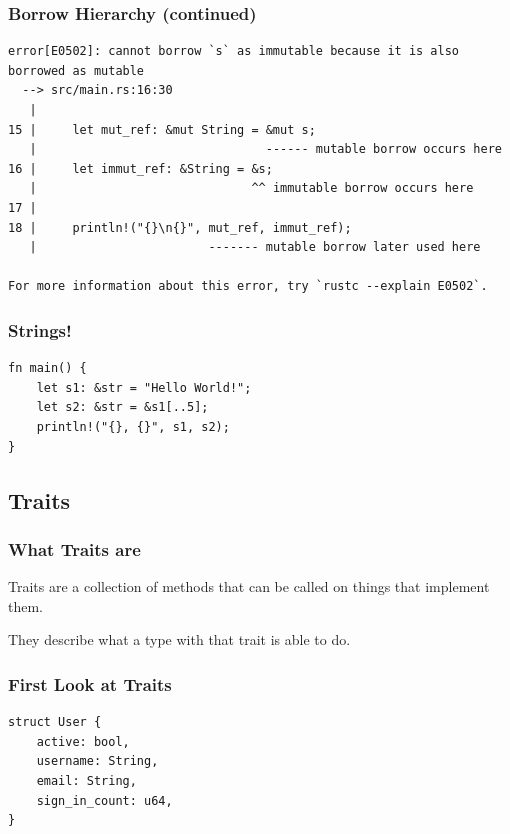 \documentclass{slides}
\begin{document}
\begin{frame}[fragile]
\frametitle{Borrow Hierarchy (continued)}
\begin{verbatim}
error[E0502]: cannot borrow `s` as immutable because it is also borrowed as mutable
  --> src/main.rs:16:30
   |
15 |     let mut_ref: &mut String = &mut s;
   |                                ------ mutable borrow occurs here
16 |     let immut_ref: &String = &s;
   |                              ^^ immutable borrow occurs here
17 |     
18 |     println!("{}\n{}", mut_ref, immut_ref);
   |                        ------- mutable borrow later used here

For more information about this error, try `rustc --explain E0502`.
\end{verbatim}
\end{frame}

\begin{frame}[fragile]
\frametitle{Strings!}
\begin{verbatim}
fn main() {
    let s1: &str = "Hello World!";
    let s2: &str = &s1[..5];
    println!("{}, {}", s1, s2);
}
\end{verbatim}
\end{frame}

\begin{frame}
\section{Traits}
\end{frame}


\begin{frame}[fragile]
\frametitle{What Traits are}
Traits are a collection of methods that can be called on things that implement them.

They describe what a type with that trait is able to do.
\end{frame}


\begin{frame}[fragile]
\frametitle{First Look at Traits}
\begin{verbatim}
struct User {
    active: bool,
    username: String,
    email: String,
    sign_in_count: u64,
}
\end{verbatim}
\end{frame}
\end{document}
